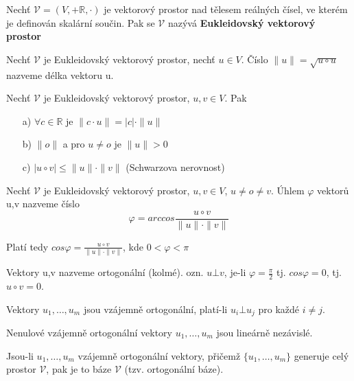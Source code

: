 \begin{definition}
	Nechť $\mathscr{V} = (V, + \mathbb{R}, \cdot)$ je vektorový prostor nad tělesem reálných čísel, ve kterém je definován skalární součin. Pak se $\mathscr{V}$ nazývá \textbf{Eukleidovský vektorový prostor}
\end{definition}

\begin{definition}
	Nechť $\mathscr{V}$ je Eukleidovský vektorový prostor, nechť $u \in V$. Číslo $\| u \| = \sqrt{u \circ u}$ nazveme délka vektoru u.
\end{definition}

\begin{definition}
	Nechť $\mathscr{V}$ je Eukleidovský vektorový prostor, $u,v \in V$. Pak
	\begin{itemize}
		\item[a)] $\forall c \in \mathbb{R}$ je $\| c \cdot u \| = |c| \cdot \| u \|$
		\item[b)] $\| o \|$ a pro $u \not= o$ je $\| u \| > 0$
		\item[c)] $|u \circ v| \leq \| u \| \cdot \| v \|$ (Schwarzova nerovnost)
	\end{itemize}
\end{definition}

\begin{definition}
	Nechť $\mathscr{V}$ je Eukleidovský vektorový prostor, $u,v \in V$, $u \not= o \not= v$. Úhlem $\varphi$ vektorů u,v nazveme číslo $$\varphi = arccos \frac{u \circ v}{\| u \| \cdot \| v \|}$$
\end{definition}
Platí tedy $cos \varphi = \frac{u \circ v}{\| u \| \cdot \| v \|}$, kde $0 < \varphi < \pi$

\begin{definition}
	Vektory u,v nazveme ortogonální (kolmé). ozn. $u \bot v$, je-li $\varphi = \frac{\pi}{2}$ tj. $cos \varphi = 0$, tj. $u \circ v = 0$.
\end{definition}

\begin{definition}
	Vektory $u_1, \dots, u_m$ jsou vzájemně ortogonální, platí-li $u_i \bot u_j$ pro každé $i \not= j$.
\end{definition}

\begin{sentence}
	Nenulové vzájemně ortogonální vektory $u_1, \dots, u_m$ jsou lineárně nezávislé.
\end{sentence}

\begin{definition}
	Jsou-li  $u_1, \dots, u_m$ vzájemně ortogonální vektory, přičemž $\{ u_1, \dots, u_m\}$ generuje celý prostor $\mathscr{V}$, pak je to báze $\mathscr{V}$ (tzv. ortogonální báze).
\end{definition}


